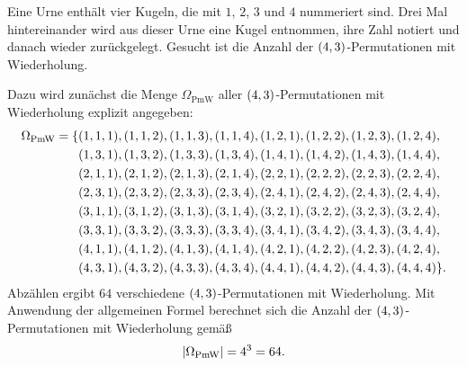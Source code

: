 \documentclass{lecture}
\begin{document}
    \begin{example}
        Eine Urne enthält vier Kugeln, die mit \(1\), \(2\), \(3\) und \(4\) nummeriert sind.
        Drei Mal hintereinander wird aus dieser Urne eine Kugel entnommen, ihre Zahl notiert und danach wieder zurückgelegt.
        Gesucht ist die Anzahl der \(\parentheses*{4, 3}\)-Permutationen mit Wiederholung.

        Dazu wird zunächst die Menge \(\Omega_{\text{PmW}}\) aller \(\parentheses*{4, 3}\)-Permutationen mit Wiederholung explizit angegeben:
        \begin{align*}
            \Omega_{\text{PmW}} = \{&\parentheses*{1, 1, 1}, \parentheses*{1, 1, 2}, \parentheses*{1, 1, 3}, \parentheses*{1, 1, 4}, \parentheses*{1, 2, 1}, \parentheses*{1, 2, 2}, \parentheses*{1, 2, 3}, \parentheses*{1, 2, 4},\\
            &\parentheses*{1, 3, 1}, \parentheses*{1, 3, 2}, \parentheses*{1, 3, 3}, \parentheses*{1, 3, 4}, \parentheses*{1, 4, 1}, \parentheses*{1, 4, 2}, \parentheses*{1, 4, 3}, \parentheses*{1, 4, 4},\\
            &\parentheses*{2, 1, 1}, \parentheses*{2, 1, 2}, \parentheses*{2, 1, 3}, \parentheses*{2, 1, 4}, \parentheses*{2, 2, 1}, \parentheses*{2, 2, 2}, \parentheses*{2, 2, 3}, \parentheses*{2, 2, 4},\\
            &\parentheses*{2, 3, 1}, \parentheses*{2, 3, 2}, \parentheses*{2, 3, 3}, \parentheses*{2, 3, 4}, \parentheses*{2, 4, 1}, \parentheses*{2, 4, 2}, \parentheses*{2, 4, 3}, \parentheses*{2, 4, 4},\\
            &\parentheses*{3, 1, 1}, \parentheses*{3, 1, 2}, \parentheses*{3, 1, 3}, \parentheses*{3, 1, 4}, \parentheses*{3, 2, 1}, \parentheses*{3, 2, 2}, \parentheses*{3, 2, 3}, \parentheses*{3, 2, 4},\\
            &\parentheses*{3, 3, 1}, \parentheses*{3, 3, 2}, \parentheses*{3, 3, 3}, \parentheses*{3, 3, 4}, \parentheses*{3, 4, 1}, \parentheses*{3, 4, 2}, \parentheses*{3, 4, 3}, \parentheses*{3, 4, 4},\\
            &\parentheses*{4, 1, 1}, \parentheses*{4, 1, 2}, \parentheses*{4, 1, 3}, \parentheses*{4, 1, 4}, \parentheses*{4, 2, 1}, \parentheses*{4, 2, 2}, \parentheses*{4, 2, 3}, \parentheses*{4, 2, 4},\\
            &\parentheses*{4, 3, 1}, \parentheses*{4, 3, 2}, \parentheses*{4, 3, 3}, \parentheses*{4, 3, 4}, \parentheses*{4, 4, 1}, \parentheses*{4, 4, 2}, \parentheses*{4, 4, 3}, \parentheses*{4, 4, 4}\}.
        \end{align*}
        Abzählen ergibt \(64\) verschiedene \(\parentheses*{4, 3}\)-Permutationen mit Wiederholung.
        Mit Anwendung der allgemeinen Formel berechnet sich die Anzahl der \(\parentheses*{4, 3}\)-Permutationen mit Wiederholung gemäß
        \[
            \absolute*{\Omega_{\text{PmW}}} = 4^3 = 64.
        \]
    \end{example}
\end{document}
